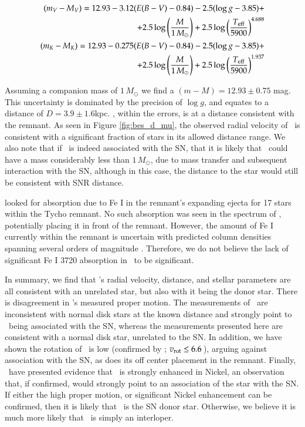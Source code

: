 \begin{eqnarray}
(m_V-M_V)=12.93-3.12(E(B-V)-0.84)-2.5 (\log{g} -3.85)+\\
+2.5\log\left(\frac{M}{1\,M_\odot }\right)+2.5\log\left( \frac{T_{\rm{eff}}}{5900} \right)^{4.688} \nonumber\\
\label{distmodv}
(m_K-M_K)=12.93-0.275(E(B-V)-0.84)-2.5 (\log{g} - 3.85)+\\
+2.5\log\left(\frac{M}{1\,M_\odot }\right)+2.5\log\left( \frac{T_{\rm{eff}}}{5900} \right)^{1.937}\nonumber
\label{distmodk}
\end{eqnarray}

Assuming a companion mass of $1\,M_\odot$ we find a $(m-M)=12.93\pm0.75$ mag. This uncertainty is dominated by the precision of $\log{g}$, and equates to a distance of $D=3.9\pm1.6$kpc. \starg, within the errors, is at a distance consistent with the remnant.  As seen in Figure \ref{fig:bes_d_mu}, the observed radial velocity of \starg\ is consistent with a significant fraction of  stars in its allowed distance range.  We also note that if \starg\ is indeed associated with the SN, that it is likely that \starg\ could have a mass considerably less than $1\,M_\odot$, due to mass transfer and subsequent interaction with the SN, although in this case, the distance to the star would still be consistent with SNR distance. 


\citet{2007PASJ...59..811I} looked for absorption due to Fe I in the remnant's expanding ejecta for 17 stars within the Tycho remnant.  No such absorption was seen in the spectrum of \starg, potentially placing it in front of the remnant. However, the amount of Fe I currently within the remnant is uncertain with predicted column densities spanning several orders of
magnitude \citep[$0.02 - 8.9 \times 10^{15}\rm{\,cm}^{-2}$;][]{Hamilton:1988p522,Ozaki:2006p517}. Therefore, we do not believe the lack of significant Fe I 3720 absorption in \starg\ to be significant.

In summary, we find that \starg's radial velocity, distance, and stellar parameters are all consistent with an unrelated star, but also with it being the donor star. There is disagreement in  \starg's measured proper motion. The measurements of \rl\ are inconsistent with normal disk stars at the known distance and strongly point to \starg\ being associated with the SN, whereas the measurements presented here are consistent with a normal disk star, unrelated to the SN. In addition, we have shown the rotation of \starg\ is low (confirmed by \gh ; $v_{\rm{rot}} \leq 6.6$\,\kms  ), arguing against association with the SN, as does its off center placement in the remnant.  Finally, \gh\ have presented evidence that \starg\ is strongly enhanced in Nickel, an observation that, if confirmed, would strongly point to an association of the star with the SN. If either the high proper motion, or significant Nickel enhancement can be confirmed, then it is likely that \starg\ is the SN donor star. Otherwise, we believe it is much more likely that \starg\ is simply an interloper.

